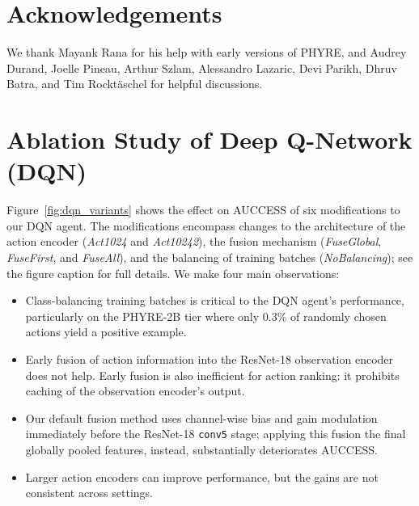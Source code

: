 \documentclass{article}
\begin{document}
\section*{Acknowledgements}
We thank Mayank Rana for his help with early versions of PHYRE, and Audrey Durand, Joelle Pineau, Arthur Szlam, Alessandro Lazaric, Devi Parikh, Dhruv Batra, and Tim Rockt{\"a}schel for helpful discussions.




\newpage
\appendix


\section{Ablation Study of Deep Q-Network (DQN)}

\label{sec:dqn_ablation}
Figure~\ref{fig:dqn_variants} shows the effect on AUCCESS of six modifications to our DQN agent. The modifications encompass changes to the architecture of the action encoder (\emph{Act1024} and \emph{Act10242}), the fusion mechanism (\emph{FuseGlobal}, \emph{FuseFirst}, and \emph{FuseAll}), and the balancing of training batches (\emph{NoBalancing});
see the figure caption for full details. We make four main observations:
\begin{itemize}[leftmargin=*]
\setlength\itemsep{0em}
\item Class-balancing training batches is critical to the DQN agent's performance, particularly on the PHYRE-2B tier where only 0.3\% of randomly chosen actions yield a positive example.
\item Early fusion of action information into the ResNet-18 observation encoder does not help. Early fusion is also inefficient for action ranking: it prohibits caching of the observation encoder's output.
\item Our default fusion method uses channel-wise bias and gain modulation immediately before the ResNet-18 \texttt{conv5} stage; applying this fusion the final globally pooled features, instead, substantially deteriorates AUCCESS.
\item Larger action encoders can improve performance, but the gains are not consistent across settings.
\end{itemize}
\end{document}
